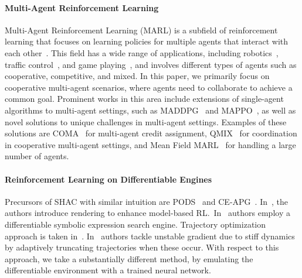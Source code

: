 \paragraph{Multi-Agent Reinforcement Learning}
Multi-Agent Reinforcement Learning (MARL) is a subfield of reinforcement learning that focuses on learning policies for multiple agents that interact with each other~\cite{albrecht2024multi}.
This field has a wide range of applications,
including robotics~\cite{DBLP:journals/air/ChungFYN24},
traffic control~\cite{DBLP:journals/tits/ChuWCL20},
and game playing~\cite{DBLP:conf/iclr/BakerKMWPMM20,jaderberg2019human},
and involves different types of agents such as cooperative, competitive, and mixed.
In this paper, we primarily focus on cooperative multi-agent scenarios,
where agents need to collaborate to achieve a common goal.
Prominent works in this area include extensions of single-agent algorithms to multi-agent settings,
such as MADDPG~\cite{DBLP:conf/nips/LoweWTHAM17} and MAPPO~\cite{DBLP:conf/nips/YuVVGWBW22},
as well as novel solutions to unique challenges in multi-agent settings. Examples of these solutions are COMA~\cite{DBLP:conf/aaai/FoersterFANW18} for multi-agent credit assignment,
QMIX~\cite{DBLP:conf/icml/RashidSWFFW18} for coordination in cooperative multi-agent settings,
and Mean Field MARL~\cite{Yang18} for handling a large number of agents.

\paragraph{Reinforcement Learning on Differentiable Engines}
Precursors of SHAC with similar intuition are PODS~\cite{Mora21} and CE-APG~\cite{Gillen22}. In~\cite{Lv23}, the authors introduce rendering to enhance model-based RL\@.\ In~\cite{Zheng24} authors employ a differentiable symbolic expression search engine. Trajectory optimization approach is taken in~\cite{Wan24}. In~\cite{Georgiev24} authors tackle unstable gradient due to stiff dynamics by adaptively truncating trajectories when these occur. With respect to this approach, we take a substantially different method, by emulating the differentiable environment with a trained neural network.
